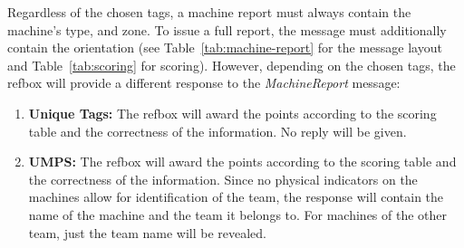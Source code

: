 \documentclass[12pt,twoside]{article}
\begin{document}
Regardless of the chosen tags, a machine report must always
contain the machine's type, and zone. To
issue a full report, the message must additionally contain the orientation
(see Table~\ref{tab:machine-report} for the message layout and Table~\ref{tab:scoring}
for scoring).
However, depending on the chosen tags, the refbox will provide a different
response to the \textit{MachineReport} message:
\begin{enumerate}
  \item \textbf{Unique Tags:} The refbox will award the points according to
  the scoring table and the correctness of the information. No
  reply will be given.
  \item \textbf{\ac{UMPS}:} The refbox will award the points according to
  the scoring table and the correctness of the information. Since no physical indicators on the machines
  allow for identification of the team, the response will contain the
  name of the machine and the team it belongs to. For machines of the other
  team, just the team name will be revealed.
\end{enumerate}
\end{document}
